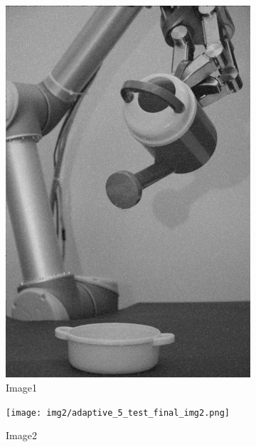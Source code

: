 \documentclass[11pt]{article}
\begin{document}
\begin{figure}[H]
    \centering
    \begin{subfigure}[b]{0.23\textwidth}
        \includegraphics[width=\textwidth]{img1/img_1_gaus_5_1_constrast_strech.png}
        \caption{Image1}
        \label{fig:result_img_1}
    \end{subfigure}
    \begin{subfigure}[b]{0.23\textwidth}
        \texttt{[image: img2/adaptive\_5\_test\_final\_img2.png]}
        \caption{Image2}
        \label{fig:result_img_2}
    \end{subfigure}
    \begin{subfigure}[b]{0.23\textwidth}

\end{subfigure}
\end{figure}
\end{document}
